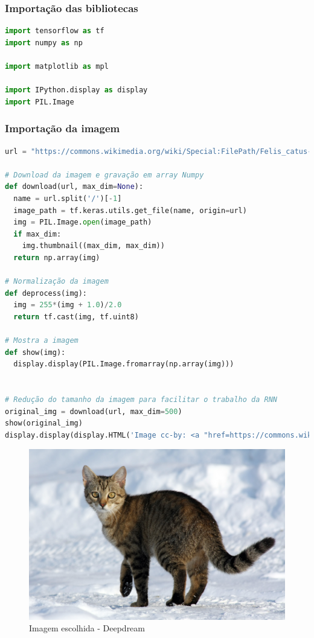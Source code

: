 \subsubsection*{Importação das bibliotecas}
\begin{lstlisting}[language=Python, style=input]
import tensorflow as tf
import numpy as np

import matplotlib as mpl

import IPython.display as display
import PIL.Image
\end{lstlisting}
\subsubsection*{Importação da imagem}
\begin{lstlisting}[language=Python, style=input]
url = "https://commons.wikimedia.org/wiki/Special:FilePath/Felis_catus-cat_on_snow.jpg"

# Download da imagem e gravação em array Numpy
def download(url, max_dim=None):
  name = url.split('/')[-1]
  image_path = tf.keras.utils.get_file(name, origin=url)
  img = PIL.Image.open(image_path)
  if max_dim:
    img.thumbnail((max_dim, max_dim))
  return np.array(img)

# Normalização da imagem
def deprocess(img):
  img = 255*(img + 1.0)/2.0
  return tf.cast(img, tf.uint8)

# Mostra a imagem
def show(img):
  display.display(PIL.Image.fromarray(np.array(img)))


# Redução do tamanho da imagem para facilitar o trabalho da RNN
original_img = download(url, max_dim=500)
show(original_img)
display.display(display.HTML('Image cc-by: <a "href=https://commons.wikimedia.org/wiki/File:Felis_catus-cat_on_snow.jpg">Von.grzanka</a>'))
\end{lstlisting}
\begin{figure}[H]
\centering
\includegraphics[width=.8\linewidth]{apendices/fig/13_IAA012_11.png}
\caption{Imagem escolhida - Deepdream}
\end{figure}
